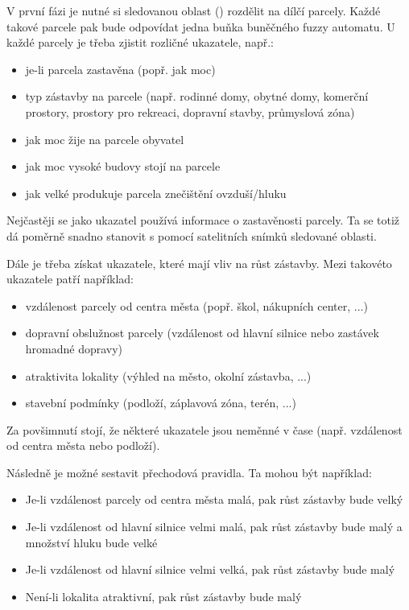 \documentclass[a4paper,10pt]{article}
\begin{document}
V první fázi je nutné si sledovanou oblast () rozdělit na dílčí parcely. Každé takové parcele pak bude odpovídat jedna buňka buněčného fuzzy automatu. U každé parcely je třeba zjistit rozličné ukazatele, např.:
\begin{itemize}
 \item je-li parcela zastavěna (popř. jak moc)
 \item typ zástavby na parcele (např. rodinné domy, obytné domy, komerční prostory, prostory pro rekreaci, dopravní stavby, průmyslová zóna)
 \item jak moc žije na parcele obyvatel
 \item jak moc vysoké budovy stojí na parcele
 \item jak velké produkuje parcela znečištění ovzduší/hluku
\end{itemize}
Nejčastěji se jako ukazatel používá informace o zastavěnosti parcely. Ta se totiž dá poměrně snadno stanovit s pomocí satelitních snímků sledované oblasti.

Dále je třeba získat ukazatele, které mají vliv na růst zástavby. Mezi takovéto ukazatele patří například:
\begin{itemize}
 \item vzdálenost parcely od centra města (popř. škol, nákupních center, ...)
 \item dopravní obslužnost parcely (vzdálenost od hlavní silnice nebo zastávek hromadné dopravy)
 \item atraktivita lokality (výhled na město, okolní zástavba, ...)
 \item stavební podmínky (podloží, záplavová zóna, terén, ...)
\end{itemize}
Za povšimnutí stojí, že některé ukazatele jsou neměnné v čase (např. vzdálenost od centra města nebo podloží).

Následně je možné sestavit přechodová pravidla. Ta mohou být například:
\begin{itemize}
 \item Je-li vzdálenost parcely od centra města malá, pak růst zástavby bude velký
 \item Je-li vzdálenost od hlavní silnice velmi malá, pak růst zástavby bude malý a množství hluku bude velké
 \item Je-li vzdálenost od hlavní silnice velmi velká, pak růst zástavby bude malý
 \item Není-li lokalita atraktivní, pak růst zástavby bude malý
\end{itemize}
\end{document}
